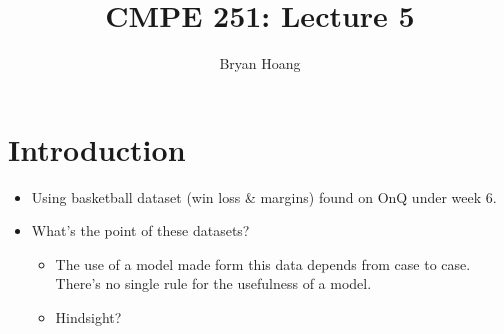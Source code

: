 \documentclass[]{memoir}
\title{CMPE 251: Lecture 5}
\author{Bryan Hoang}
\begin{document}
  \maketitle

  \section*{Introduction}
  \begin{itemize}
    \item Using basketball dataset (win loss \& margins) found on OnQ under week 6.
    \item What's the point of these datasets?
          \begin{itemize}
            \item The use of a model made form this data depends from case to case. There's no single rule for the usefulness of a model.
            \item Hindsight?
          \end{itemize}
  \end{itemize}
\end{document}
